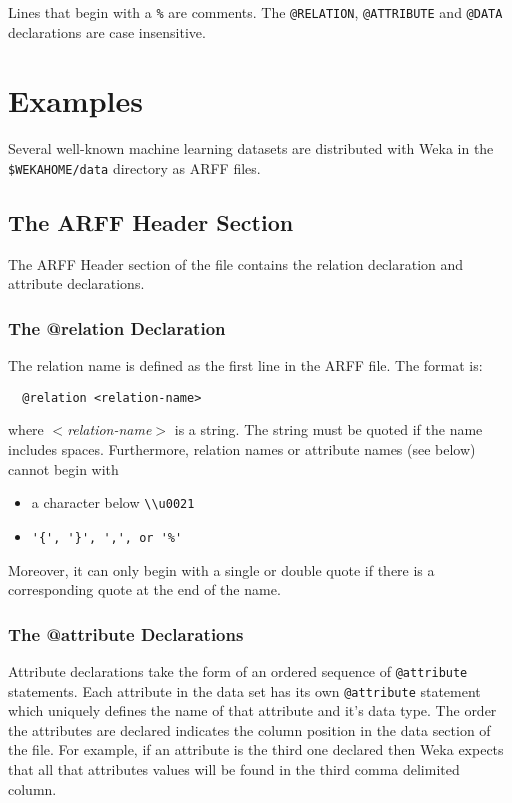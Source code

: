 Lines that begin with a \texttt{\%} are comments. The \texttt{@RELATION}, \texttt{@ATTRIBUTE} and \texttt{@DATA} declarations are case insensitive.


\section{Examples}
Several well-known machine learning datasets are distributed with Weka in the \texttt{\$WEKAHOME/data} directory as ARFF files.


\subsection{The ARFF Header Section}
The ARFF Header section of the file contains the relation declaration and attribute declarations. 


\subsubsection*{The @relation Declaration}
The relation name is defined as the first line in the ARFF file. The format is:

\begin{verbatim}
  @relation <relation-name>
\end{verbatim}

where \textit{$<$relation-name$>$} is a string. The string must be quoted if the name includes spaces. Furthermore, relation names or attribute names (see below) cannot begin with

\begin{itemize}
	\item a character below \verb+\\u0021+
        \item \verb+'{', '}', ',', or '%'+
\end{itemize}

Moreover, it can only begin with a single or double quote if there is a corresponding quote at the end of the name.

\subsubsection*{The @attribute Declarations}
Attribute declarations take the form of an ordered sequence of \texttt{@attribute} statements. Each attribute in the data set has its own \texttt{@attribute} statement which uniquely defines the name of that attribute and it's data type. The order the attributes are declared indicates the column position in the data section of the file. For example, if an attribute is the third one declared then Weka expects that all that attributes values will be found in the third comma delimited column.

